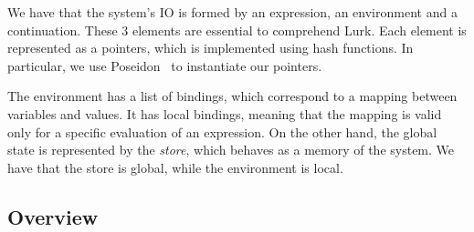 \documentclass[10pt, english]{article}
\begin{document}
We have that the system's IO is formed by an expression, an environment and a continuation. These 3 elements are essential to comprehend Lurk. Each element is represented as a pointers, which is implemented using hash functions. In particular, we use Poseidon~\cite{poseidon} to instantiate our pointers.

The environment has a list of bindings, which correspond to a mapping between variables and values. It has local bindings, meaning that the mapping is valid only for a specific evaluation of an expression. On the other hand, the global state is represented by the \textit{store}, which behaves as a memory of the system. We have that the store is global, while the environment is local.

\subsection{Overview}
\end{document}
